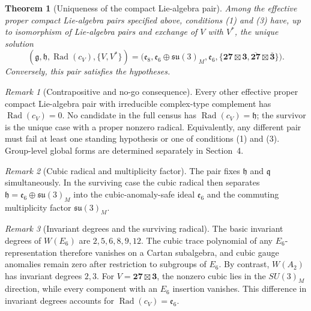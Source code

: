 \documentclass[11pt]{article}
\newtheorem{theorem}{Theorem}[section]
\theoremstyle{remark}
\newtheorem*{remark}{Remark}
\newcommand{\g}{\mathfrak g}
\newcommand{\h}{\mathfrak h}
\newcommand{\e}{\mathfrak e}
\newcommand{\su}{\mathfrak{su}}
\newcommand{\Rad}{\operatorname{Rad}}
\newcommand{\boxt}{\boxtimes}
\begin{document}
\begin{theorem}[Uniqueness of the compact Lie-algebra pair\protect\footnotemark]
\label{thm:main}
Among the effective proper compact Lie-algebra pairs specified
above, conditions \textup{(1)} and \textup{(3)} have, up to isomorphism of
Lie-algebra pairs and exchange of \(V\) with \(V^*\), the unique solution
\[
 (\g,\h,\Rad(c_V),\{V,V^*\})
 =
 \bigl(\e_8,\e_6\oplus\su(3)_M,\e_6,
 \{\mathbf{27}\boxt\mathbf3,
   \overline{\mathbf{27}}\boxt\overline{\mathbf3}\}\bigr). \tag{5}
\]
Conversely, this pair satisfies the hypotheses.
\end{theorem}

\begin{remark}[Contrapositive and no-go consequence]
Every other effective proper compact Lie-algebra pair with
irreducible complex-type complement has \(\Rad(c_V)=0\). No candidate in the
full census has \(\Rad(c_V)=\mathfrak h\); the survivor is the unique case
with a proper nonzero radical. Equivalently, any different pair
must fail at least one standing hypothesis or one of conditions
\textup{(1)} and \textup{(3)}.  Group-level global forms are determined
separately in Section~4.
\end{remark}

\begin{remark}[Cubic radical and multiplicity factor]
The pair fixes \(\mathfrak h\) and \(\mathfrak q\) simultaneously.  In the
surviving case the cubic radical then separates
\(\mathfrak h=\mathfrak e_6\oplus\mathfrak{su}(3)_M\) into the
cubic-anomaly-safe ideal \(\mathfrak e_6\) and the commuting multiplicity factor
\(\mathfrak{su}(3)_M\).
\end{remark}

\begin{remark}[Invariant degrees and the surviving radical]
The basic invariant degrees of \(W(E_6)\) are
\(2,5,6,8,9,12\). The cubic trace polynomial of any
\(E_6\)-representation therefore vanishes on a Cartan subalgebra, and cubic
gauge anomalies remain zero after restriction to subgroups of \(E_6\). By
contrast, \(W(A_2)\) has invariant degrees \(2,3\). For
\(V=\mathbf{27}\boxtimes\mathbf3\), the nonzero cubic lies in the
\(SU(3)_M\) direction, while every component with an \(E_6\) insertion
vanishes. This difference in invariant degrees accounts for
\(\Rad(c_V)=\e_6\).
\end{remark}
\end{document}
